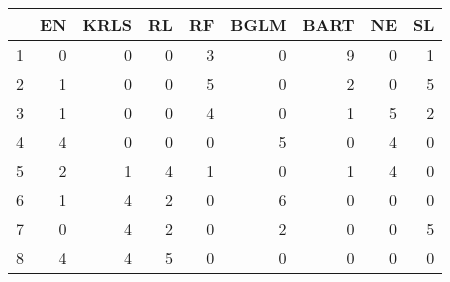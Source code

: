 \begin{table}[ht]
\centering
\begin{tabular}{rrrrrrrrr}
  \hline
 & EN & KRLS & RL & RF & BGLM & BART & NE & SL \\ 
  \hline
1 &   0 &   0 &   0 &   3 &   0 &   9 &   0 &   1 \\ 
  2 &   1 &   0 &   0 &   5 &   0 &   2 &   0 &   5 \\ 
  3 &   1 &   0 &   0 &   4 &   0 &   1 &   5 &   2 \\ 
  4 &   4 &   0 &   0 &   0 &   5 &   0 &   4 &   0 \\ 
  5 &   2 &   1 &   4 &   1 &   0 &   1 &   4 &   0 \\ 
  6 &   1 &   4 &   2 &   0 &   6 &   0 &   0 &   0 \\ 
  7 &   0 &   4 &   2 &   0 &   2 &   0 &   0 &   5 \\ 
  8 &   4 &   4 &   5 &   0 &   0 &   0 &   0 &   0 \\ 
   \hline
\end{tabular}
\end{table}
